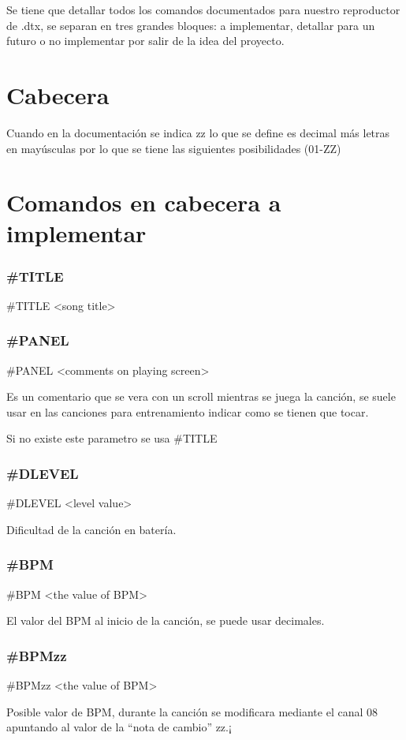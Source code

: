 \documentclass[a4paper,11pt,oneside]{book}
\begin{document}
Se tiene que detallar todos los comandos documentados para nuestro reproductor de .dtx, se separan en tres grandes bloques: a implementar, detallar para un futuro o  no implementar por salir de la idea del proyecto.

\section{Cabecera}

Cuando en la documentación se indica zz lo que se define es decimal más letras en mayúsculas por lo que se tiene las siguientes posibilidades (01-ZZ) 

\section{Comandos en cabecera a implementar}

\subsubsection{\#TITLE}
\#TITLE <song title>

\subsubsection{\#PANEL}
\#PANEL <comments on playing screen>

Es un comentario que se vera con un scroll mientras se juega la canción, se suele usar en las canciones para entrenamiento indicar como se tienen que tocar.

Si no existe este parametro se usa \#TITLE

\subsubsection{\#DLEVEL}
\#DLEVEL <level value>

Dificultad de la canción en batería.

\subsubsection{\#BPM}
\#BPM <the value of BPM>

El valor del BPM al inicio de la canción, se puede usar decimales.
\subsubsection{\#BPMzz}
\#BPMzz <the value of BPM>

Posible valor de BPM, durante la canción se modificara mediante el canal 08 apuntando al valor de la ``nota de cambio'' zz.¡
\end{document}

